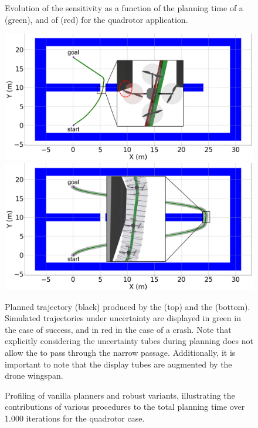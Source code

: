 \begin{figure} [H]
    \centering
     
    \caption{Evolution of the sensitivity as a function of the planning time of a  (green), and of  (red) for the quadrotor application.}%
    \label{fig:samp_quad_time}%
\end{figure}

\begin{figure} [H]
    \centering
    \includegraphics[width=0.9\linewidth]{figures/samp/non_robust_quad.png}
    \includegraphics[width=0.9\linewidth]{figures/samp/robust_quad.png}
    \caption{Planned trajectory (black) produced by the  (top) and the  (bottom). 
    Simulated trajectories under uncertainty are displayed in green in the case of success, and in red in the case of a crash.
    Note that explicitly considering the uncertainty tubes during planning does not allow the  to pass through the narrow passage.
    Additionally, it is important to note that the display tubes are augmented by the drone wingspan.}%
    \label{fig:robust_quad}%
\end{figure}

\begin{figure} [H]
    \centering
     
    \caption{Profiling of vanilla planners and robust variants, illustrating the contributions of various procedures to the total planning time over 1.000 iterations for the quadrotor case.
    }%
    \label{fig:profiling_quad}%
\end{figure}

